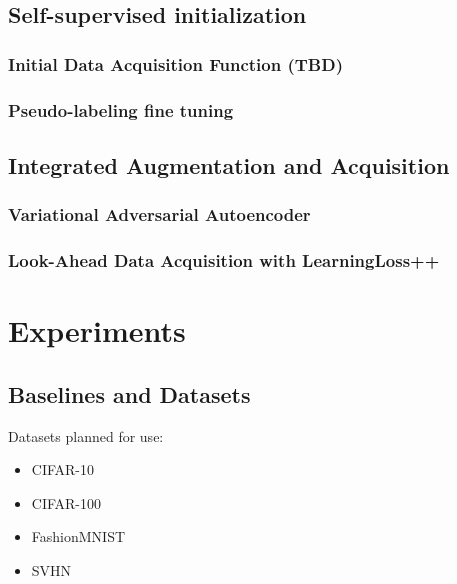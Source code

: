 \documentclass{article}
\begin{document}
\subsection{Self-supervised initialization}

\subsubsection{Initial Data Acquisition Function (TBD)}

\subsubsection{Pseudo-labeling fine tuning}

\subsection{Integrated Augmentation and Acquisition}

\subsubsection{Variational Adversarial Autoencoder}

\subsubsection{Look-Ahead Data Acquisition with LearningLoss++}

\section{Experiments}

\subsection{Baselines and Datasets}

Datasets planned for use:

\begin{itemize}
    \item CIFAR-10
    \item CIFAR-100
    \item FashionMNIST
    \item SVHN
\end{itemize}

\end{document}
